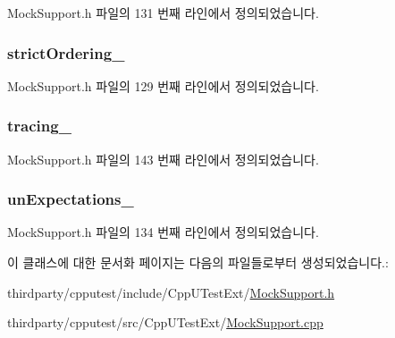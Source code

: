 Mock\+Support.\+h 파일의 131 번째 라인에서 정의되었습니다.

\subsubsection[{\texorpdfstring{strict\+Ordering\+\_\+}{strictOrdering_}}]{ strict\+Ordering\+\_\+\hspace{0.3cm}{\ttfamily [private]}}\hypertarget{class_mock_support_aeabf06d13371d5bbf5663b47374d9ebb}{}\label{class_mock_support_aeabf06d13371d5bbf5663b47374d9ebb}


Mock\+Support.\+h 파일의 129 번째 라인에서 정의되었습니다.

\subsubsection[{\texorpdfstring{tracing\+\_\+}{tracing_}}]{ tracing\+\_\+\hspace{0.3cm}{\ttfamily [private]}}\hypertarget{class_mock_support_a37e443d21e04cf8d6c14d46013cdafdb}{}\label{class_mock_support_a37e443d21e04cf8d6c14d46013cdafdb}


Mock\+Support.\+h 파일의 143 번째 라인에서 정의되었습니다.

\subsubsection[{\texorpdfstring{un\+Expectations\+\_\+}{unExpectations_}}]{ un\+Expectations\+\_\+\hspace{0.3cm}{\ttfamily [private]}}\hypertarget{class_mock_support_a4a55b86a3e9c4570ce32185e5798454e}{}\label{class_mock_support_a4a55b86a3e9c4570ce32185e5798454e}


Mock\+Support.\+h 파일의 134 번째 라인에서 정의되었습니다.



이 클래스에 대한 문서화 페이지는 다음의 파일들로부터 생성되었습니다.\+:\begin{DoxyCompactItemize}
\item 
thirdparty/cpputest/include/\+Cpp\+U\+Test\+Ext/\hyperlink{_mock_support_8h}{Mock\+Support.\+h}\item 
thirdparty/cpputest/src/\+Cpp\+U\+Test\+Ext/\hyperlink{_mock_support_8cpp}{Mock\+Support.\+cpp}\end{DoxyCompactItemize}
